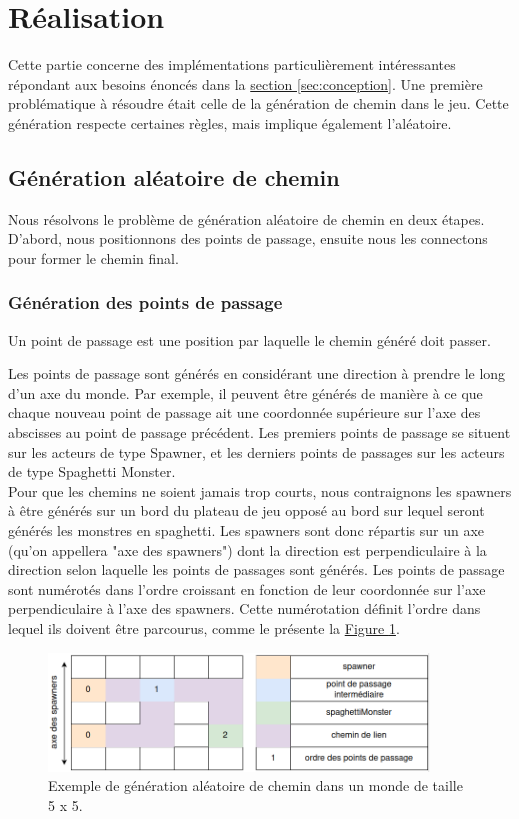 \documentclass{article}
\begin{document}
\section{Réalisation}

Cette partie concerne des implémentations particulièrement intéressantes répondant aux besoins énoncés dans la \hyperref[sec:conception]{section \ref{sec:conception}}. Une première problématique à résoudre était celle de la génération de chemin dans le jeu. Cette génération respecte certaines règles, mais implique également l'aléatoire.

\subsection{Génération aléatoire de chemin}
Nous résolvons le problème de génération aléatoire de chemin en deux étapes. D'abord, nous positionnons des points de passage, ensuite nous les connectons pour former le chemin final.

\subsubsection{Génération des points de passage}
Un point de passage est une position par laquelle le chemin généré doit passer.

Les points de passage sont générés en considérant une direction à prendre le long d'un axe du monde. Par exemple, il peuvent être générés de manière à ce que chaque nouveau point de passage ait une coordonnée supérieure sur l'axe des abscisses au point de passage précédent.
Les premiers points de passage se situent sur les acteurs de type Spawner, et les derniers points de passages sur les acteurs de type Spaghetti Monster.\\
Pour que les chemins ne soient jamais trop courts, nous contraignons les spawners à être générés sur un bord du plateau de jeu opposé au bord sur lequel seront générés les monstres en spaghetti.
Les spawners sont donc répartis sur un axe (qu'on appellera "axe des spawners") dont la direction est perpendiculaire à la direction selon laquelle les points de passages sont générés. Les points de passage sont numérotés dans l'ordre croissant en fonction de leur coordonnée sur l'axe perpendiculaire à l'axe des spawners. Cette numérotation définit l'ordre dans lequel ils doivent être parcourus, comme le présente la \hyperref[fig:points de passage]{Figure \ref{fig:points de passage}}.

\begin{figure}[H]
    \centering
    \includegraphics[width = 0.9\textwidth]{points_de_passage.png}
    \caption{Exemple de génération aléatoire de chemin dans un monde de taille 5 x 5.}
    \label{fig:points de passage}
\end{figure}
\end{document}
